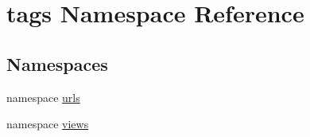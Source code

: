 \hypertarget{namespacetags}{
\section{tags Namespace Reference}
\label{namespacetags}
}
\subsection*{Namespaces}
\begin{DoxyCompactItemize}
\item 
namespace \hyperlink{namespacetags_1_1urls}{urls}
\item 
namespace \hyperlink{namespacetags_1_1views}{views}
\end{DoxyCompactItemize}
